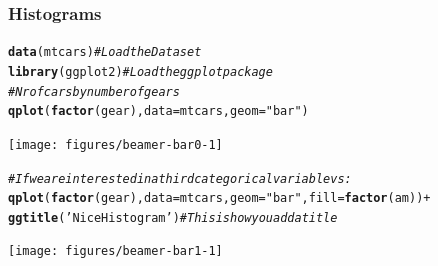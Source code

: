 \documentclass{beamer}\usepackage[]{graphicx}\usepackage[]{color}
\makeatletter
\newcommand{\hlstr}[1]{\textcolor[rgb]{0.192,0.494,0.8}{#1}}%
\newcommand{\hlcom}[1]{\textcolor[rgb]{0.678,0.584,0.686}{\textit{#1}}}%
\newcommand{\hlopt}[1]{\textcolor[rgb]{0,0,0}{#1}}%
\newcommand{\hlstd}[1]{\textcolor[rgb]{0.345,0.345,0.345}{#1}}%
\newcommand{\hlkwc}[1]{\textcolor[rgb]{0.333,0.667,0.333}{#1}}%
\newcommand{\hlkwd}[1]{\textcolor[rgb]{0.737,0.353,0.396}{\textbf{#1}}}%
\newenvironment{kframe}{%
 \def\at@end@of@kframe{}%
 \ifinner\ifhmode%
  \def\at@end@of@kframe{\end{minipage}}%
  \begin{minipage}{\columnwidth}%
 \fi\fi%
 \def\FrameCommand##1{\hskip\@totalleftmargin \hskip-\fboxsep
 \colorbox{shadecolor}{##1}\hskip-\fboxsep
     \hskip-\linewidth \hskip-\@totalleftmargin \hskip\columnwidth}%
 \MakeFramed {\advance\hsize-\width
   \@totalleftmargin\z@ \linewidth\hsize
   \@setminipage}}%
 {\par\unskip\endMakeFramed%
 \at@end@of@kframe}
\newenvironment{knitrout}{}{} %
\makeatother
\begin{document}
\begin{frame}
\frametitle{Histograms}

\begin{knitrout}\scriptsize
{}\color{fgcolor}\begin{kframe}
\begin{alltt}
\hlkwd{data}\hlstd{(mtcars)}  \hlcom{# Load the Dataset}
\hlkwd{library}\hlstd{(ggplot2)}  \hlcom{# Load the ggplot package}
\hlcom{# Nr of cars by number of gears}
\hlkwd{qplot}\hlstd{(}\hlkwd{factor}\hlstd{(gear),} \hlkwc{data} \hlstd{= mtcars,} \hlkwc{geom} \hlstd{=} \hlstr{"bar"}\hlstd{)}
\end{alltt}
\end{kframe}

{\centering \texttt{[image: figures/beamer-bar0-1]} 

}



\end{knitrout}

\begin{knitrout}\scriptsize
{}\color{fgcolor}\begin{kframe}
\begin{alltt}
\hlcom{# If we are interested in a third categorical variable vs:}
\hlkwd{qplot}\hlstd{(}\hlkwd{factor}\hlstd{(gear),} \hlkwc{data}\hlstd{=mtcars,} \hlkwc{geom}\hlstd{=}\hlstr{"bar"}\hlstd{,} \hlkwc{fill}\hlstd{=}\hlkwd{factor}\hlstd{(am))} \hlopt{+}
\hlkwd{ggtitle}\hlstd{(}\hlstr{'Nice Histogram'}\hlstd{)} \hlcom{# This is how you add a title}
\end{alltt}
\end{kframe}

{\centering \texttt{[image: figures/beamer-bar1-1]} 

}



\end{knitrout}
\end{frame}
\end{document}
